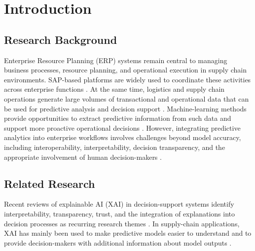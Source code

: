 \documentclass[manuscript, screen, review]{acmart}
\begin{document}

\maketitle

\section{Introduction}

\subsection{Research Background}

Enterprise Resource Planning (ERP) systems remain central to managing business processes, 
resource planning, and operational execution in supply chain environments. 
SAP-based platforms are widely used to coordinate these activities across enterprise 
functions \cite{monk2006sap}.
At the same time, logistics and supply chain operations generate large volumes of 
transactional and operational data that can be used for predictive analysis and 
decision support \cite{constante2019dataco}.
Machine-learning methods provide opportunities to 
extract predictive information from such data and support 
more proactive operational decisions
 \cite{xu2021industry40,olan2024xai_supplychain}.
However, integrating predictive analytics into 
enterprise workflows involves challenges beyond model accuracy, 
including interoperability, interpretability, 
decision transparency, and the appropriate involvement 
of human decision-makers \cite{amershi2019guidelines,li2024xai_supplychain}.

\subsection{Related Research}

Recent reviews of explainable AI (XAI) in decision-support systems
identify interpretability, transparency, trust, and the integration of
explanations into decision processes as recurring research themes
\cite{kostopoulos2024xai_dss,ezeji2024explainable_dss,fanfani2026human_dss}.
In supply-chain applications, XAI has mainly been used to make
predictive models easier to understand and to provide decision-makers
with additional information about model outputs
\cite{olan2024xai_supplychain,kosasih2024xai_supplychain}.
\end{document}
